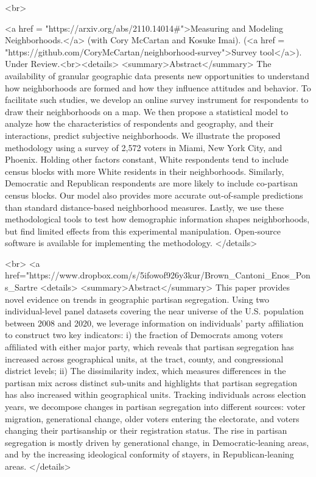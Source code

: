                <br>



<a href = "https://arxiv.org/abs/2110.14014#">Measuring and Modeling Neighborhoods.</a> (with Cory McCartan and Kosuke Imai). (<a href = "https://github.com/CoryMcCartan/neighborhood-survey">Survey tool</a>). Under Review.<br><details>
  <summary>Abstract</summary>
  The availability of granular geographic data presents new opportunities to understand how neighborhoods are formed and how they influence attitudes and behavior. To facilitate such studies, we develop an online survey instrument for respondents to draw their neighborhoods on a map. We then propose a statistical model to analyze how the characteristics of respondents and geography, and their interactions, predict subjective neighborhoods. We illustrate the proposed methodology using a survey of 2,572 voters in Miami, New York City, and Phoenix. Holding other factors constant, White respondents tend to include census blocks with more White residents in their neighborhoods. Similarly, Democratic and Republican respondents are more likely to include co-partisan census blocks. Our model also provides more accurate out-of-sample predictions than standard distance-based neighborhood measures. Lastly, we use these methodological tools to test how demographic information shapes neighborhoods, but find limited effects from this experimental manipulation. Open-source software is available for implementing the methodology.
</details>

<br> <a href="https://www.dropbox.com/s/5ifowof926y3kur/Brown_Cantoni_Enos_Pons_Sartre%
<details>
  <summary>Abstract</summary>
  This paper provides novel evidence on trends in geographic partisan segregation. Using two individual-level panel datasets covering the near universe of the U.S. population between 2008 and 2020, we leverage information on individuals’ party afﬁliation to construct two key indicators: i) the fraction of Democrats among voters afﬁliated with either major party, which reveals that partisan segregation has increased across geographical units, at the tract, county, and congressional district levels; ii) The dissimilarity index, which measures differences in the partisan mix across distinct sub-units and highlights that partisan segregation has also increased within geographical units. Tracking individuals across election years, we decompose changes in partisan segregation into different sources: voter migration, generational change, older voters entering the electorate, and voters changing their partisanship or their registration status. The rise in partisan segregation is mostly driven by generational change, in Democratic-leaning areas, and by the increasing ideological conformity of stayers, in Republican-leaning areas.
</details>



